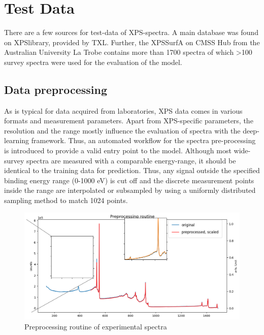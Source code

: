\label{test_data}
\section{Test Data}

There are a few sources for test-data of XPS-spectra. A main database was found on XPSlibrary, provided by TXL. Further, the XPSSurfA on CMSS Hub from the Australian University La Trobe contains more than 1700 spectra of which >100 survey spectra were used for the evaluation of the model.


\subsection{Data preprocessing}

As is typical for data acquired from laboratories, XPS data comes in various formats and measurement parameters. Apart from XPS-specific parameters, the resolution and the range mostly influence the evaluation of spectra with the deep-learning framework. Thus, an automated workflow for the spectra pre-processing is introduced to provide a valid entry point to the model.
Although most wide-survey spectra are measured with a comparable energy-range, it should be identical to the training data for prediction. Thus, any signal outside the specified binding energy range (0-1000 eV) is cut off and the discrete measurement points inside the range are interpolated or subsampled by using a uniformly distributed sampling method to match 1024 points.

\begin{figure}
    \centering
    \includegraphics[width=\textwidth]{Figures/preprocessing_routine.png}
    \caption{Preprocessing routine of experimental spectra}
    \label{fig:preproc_routine}
\end{figure}

